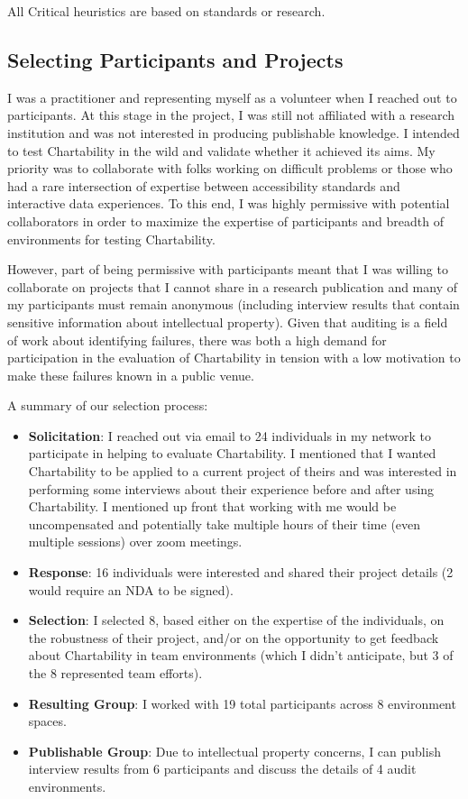 \documentclass{egpubl}
\begin{document}
All Critical heuristics are based on standards or research.

\subsection{Selecting Participants and Projects}
I was a practitioner and representing myself as a volunteer when I reached out to participants. At this stage in the project, I was still not affiliated with a research institution and was not interested in producing publishable knowledge. I intended to test Chartability in the wild and validate whether it achieved its aims. My priority was to collaborate with folks working on difficult problems or those who had a rare intersection of expertise between accessibility standards and interactive data experiences. To this end, I was highly permissive with potential collaborators in order to maximize the expertise of participants and breadth of environments for testing Chartability. 

However, part of being permissive with participants meant that I was willing to collaborate on projects that I cannot share in a research publication and many of my participants must remain anonymous (including interview results that contain sensitive information about intellectual property). Given that auditing is a field of work about identifying failures, there was both a high demand for participation in the evaluation of Chartability in tension with a low motivation to make these failures known in a public venue.

A summary of our selection process:
\begin{itemize}
    \item \textbf{Solicitation}: I reached out via email to 24 individuals in my network to participate in helping to evaluate Chartability. I mentioned that I wanted Chartability to be applied to a current project of theirs and was interested in performing some interviews about their experience before and after using Chartability. I mentioned up front that working with me would be uncompensated and potentially take multiple hours of their time (even multiple sessions) over zoom meetings.
    \item \textbf{Response}: 16 individuals were interested and shared their project details (2 would require an NDA to be signed). 
    \item \textbf{Selection}: I selected 8, based either on the expertise of the individuals, on the robustness of their project, and/or on the opportunity to get feedback about Chartability in team environments (which I didn't anticipate, but 3 of the 8 represented team efforts).
    \item \textbf{Resulting Group}: I worked with 19 total participants across 8 environment spaces.
    \item \textbf{Publishable Group}: Due to intellectual property concerns, I can publish interview results from 6 participants and discuss the details of 4 audit environments.
\end{itemize}
\end{document}
